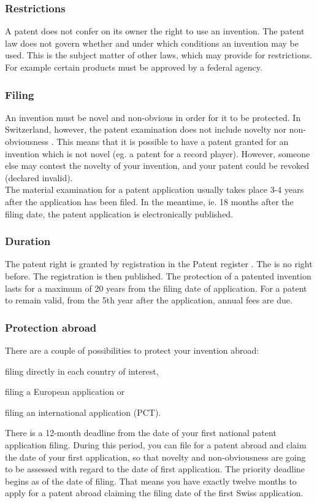 \subsubsection{Restrictions}
A patent does not confer on its owner the right to use an invention. The patent law does not govern whether and under which conditions an invention may be used. This is the subject matter of other laws, which may provide for restrictions. For example certain products must be approved by a federal agency.

\subsubsection{Filing}
An invention must be novel and non-obvious in order for it to be protected. In Switzerland, however, the patent examination does not include novelty nor non-obviousness . This means that it is possible to have a patent granted for an invention which is not novel (eg. a patent for a record player). However, someone else may contest the novelty of your invention, and your patent could be revoked (declared invalid). \\
The material examination for a patent application usually takes place 3-4 years after the application has been filed. In the meantime, ie. 18 months after the filing date, the patent application is electronically published.

\subsubsection{Duration}
The patent right is granted by registration in the Patent register . The is no right before. The registration is then published. The protection of a patented invention lasts for a maximum of 20 years from the filing date of application. For a patent to remain valid, from the 5th year after the application, annual fees are due.

\subsubsection{Protection abroad}
There are a couple of possibilities to protect your invention abroad:
\begin{compactitem}
	\item filing directly in each country of interest,
	\item filing a European application or
	\item filing an international application (PCT).
\end{compactitem}
There is a 12-month deadline from the date of your first national patent application filing. During this period, you can file for a patent abroad and claim the date of your first application, so that novelty and non-obviousness are going to be assessed with regard to the date of first application. The priority deadline begins as of the date of filing. That means you have exactly twelve months to apply for a patent abroad claiming the filing date of the first Swiss application.

